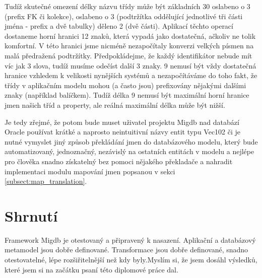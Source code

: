 \documentclass[11pt,twoside,a4paper]{book}
\begin{document}
Tudíž skutečné omezení délky názvu třídy může být základních 30 oslabeno o 3
(prefix FK či kolekce), oslabeno o 3 (podtržítka oddělující jednotlivé tři
části jména - prefix a dvě tabulky) děleno 2 (dvě části). Aplikací těchto
operací dostaneme horní hranici 12 znaků, která vypadá jako dostatečná, ačkoliv 
ne tolik komfortní. V této hranici jsme nicméně nezapočítaly konverzi velkých
písmen na malá předražená podtržítky. Předpokládejme, že každý identifikátor
nebude mít víc jak 3 slova, tudíž musíme odečíst další 3 znaky. 9 nemusí být
vždy dostatečná hranice vzhledem k velikosti nynějších systémů a nezapočítáváme
do toho fakt, že třídy v aplikačním modelu mohou (a často jsou) prefixovány
nějakými dalšími znaky (například balíčkem). Tudíž délka 9 nemusí
být maximální horní hranice jmen našich tříd a property, ale reálná
maximální délka může být nižší. 

Je tedy zřejmé, že potom bude muset uživatel projektu Migdb nad databází Oracle
používat krátké a naprosto neintuitivní názvy entit typu Vec102 či je nutné
vymyslet jiný způsob překládání jmen do databázového modelu, který bude
automatizovaný, jednoznačný, nezávislý na ostatních entitách v modelu a nejlépe
pro člověka snadno získatelný bez pomoci nějakého překladače a nahradit
implementaci modulu mapování jmen popsanou v sekci
\ref{subsect:map_translation}.


\section{Shrnutí}
Framework Migdb je otestovaný a připravený k nasazení.
Aplikační a databázový metamodel jsou dobře definované. Transformace jsou dobře
definované, snadno otestovatelné, lépe rozšiřitelnější než kdy byly.Myslím si,
že jsem dosáhl výsledků, které jsem si na začátku psaní této diplomové práce dal. 

\end{document}
